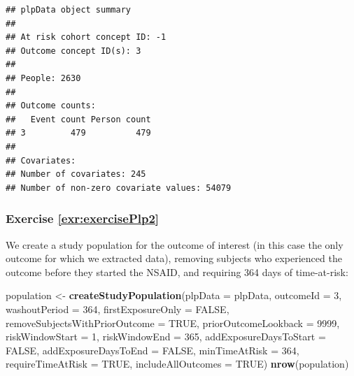 \documentclass[11pt]{book}
\newenvironment{Shaded}{\begin{snugshade}}{\end{snugshade}}
\newcommand{\DataTypeTok}[1]{\textcolor[rgb]{0.13,0.29,0.53}{#1}}
\newcommand{\DecValTok}[1]{\textcolor[rgb]{0.00,0.00,0.81}{#1}}
\newcommand{\KeywordTok}[1]{\textcolor[rgb]{0.13,0.29,0.53}{\textbf{#1}}}
\newcommand{\NormalTok}[1]{#1}
\newcommand{\OtherTok}[1]{\textcolor[rgb]{0.56,0.35,0.01}{#1}}
\newcommand{\StringTok}[1]{\textcolor[rgb]{0.31,0.60,0.02}{#1}}
\theoremstyle{definition}
\theoremstyle{definition}
\theoremstyle{definition}
\theoremstyle{remark}
\begin{document}
\begin{verbatim}
## plpData object summary
## 
## At risk cohort concept ID: -1
## Outcome concept ID(s): 3
## 
## People: 2630
## 
## Outcome counts:
##   Event count Person count
## 3         479          479
## 
## Covariates:
## Number of covariates: 245
## Number of non-zero covariate values: 54079
\end{verbatim}

\hypertarget{exercise-refexrexerciseplp2}{%
\subsubsection*{Exercise \ref{exr:exercisePlp2}}\label{exercise-refexrexerciseplp2}}

We create a study population for the outcome of interest (in this case the only outcome for which we extracted data), removing subjects who experienced the outcome before they started the NSAID, and requiring 364 days of time-at-risk:

\begin{Shaded}
\begin{Highlighting}[]
\NormalTok{population <-}\StringTok{ }\KeywordTok{createStudyPopulation}\NormalTok{(}\DataTypeTok{plpData =}\NormalTok{ plpData,}
                                    \DataTypeTok{outcomeId =} \DecValTok{3}\NormalTok{,}
                                    \DataTypeTok{washoutPeriod =} \DecValTok{364}\NormalTok{,}
                                    \DataTypeTok{firstExposureOnly =} \OtherTok{FALSE}\NormalTok{,}
                                    \DataTypeTok{removeSubjectsWithPriorOutcome =} \OtherTok{TRUE}\NormalTok{,}
                                    \DataTypeTok{priorOutcomeLookback =} \DecValTok{9999}\NormalTok{,}
                                    \DataTypeTok{riskWindowStart =} \DecValTok{1}\NormalTok{,}
                                    \DataTypeTok{riskWindowEnd =} \DecValTok{365}\NormalTok{,}
                                    \DataTypeTok{addExposureDaysToStart =} \OtherTok{FALSE}\NormalTok{,}
                                    \DataTypeTok{addExposureDaysToEnd =} \OtherTok{FALSE}\NormalTok{,}
                                    \DataTypeTok{minTimeAtRisk =} \DecValTok{364}\NormalTok{,}
                                    \DataTypeTok{requireTimeAtRisk =} \OtherTok{TRUE}\NormalTok{,}
                                    \DataTypeTok{includeAllOutcomes =} \OtherTok{TRUE}\NormalTok{)}
\KeywordTok{nrow}\NormalTok{(population)}
\end{Highlighting}
\end{Shaded}
\end{document}

